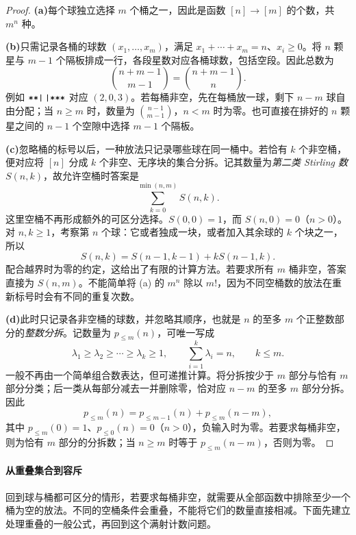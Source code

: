 \documentclass[lang=cn,a4paper,fontset=none,zihao=false,10pt,openany,twoside]{beautybook}
\numberwithin{algorithm}{chapter}
\begin{document}
\begin{proof}
\par\smallskip\noindent\textbf{(a)}\quad 每个球独立选择 $m$ 个桶之一，因此是函数 $[n]\to[m]$ 的个数，共 $m^n$ 种。

\par\smallskip\noindent\textbf{(b)}\quad 只需记录各桶的球数 $(x_1,\ldots,x_m)$，满足 $x_1+\cdots+x_m=n$、$x_i\ge0$。将 $n$ 颗星与 $m-1$ 个隔板排成一行，各段星数对应各桶球数，包括空段。因此总数为
\[
 \binom{n+m-1}{m-1}=\binom{n+m-1}n.
\]
例如 $\texttt{**|\,|***}$ 对应 $(2,0,3)$。若每桶非空，先在每桶放一球，剩下 $n-m$ 球自由分配；当 $n\ge m$ 时，数量为 $\binom{n-1}{m-1}$，$n<m$ 时为零。也可直接在排好的 $n$ 颗星之间的 $n-1$ 个空隙中选择 $m-1$ 个隔板。

\par\smallskip\noindent\textbf{(c)}\quad 忽略桶的标号以后，一种放法只记录哪些球在同一桶中。若恰有 $k$ 个非空桶，便对应将 $[n]$ 分成 $k$ 个非空、无序块的集合分拆。记其数量为\emph{第二类 Stirling 数} $S(n,k)$，故允许空桶时答案是
\[
 \sum_{k=0}^{\min(n,m)}S(n,k).
\]
这里空桶不再形成额外的可区分选择。$S(0,0)=1$，而 $S(n,0)=0$（$n>0$）。对 $n,k\ge1$，考察第 $n$ 个球：它或者独成一块，或者加入其余球的 $k$ 个块之一，所以
\[
 S(n,k)=S(n-1,k-1)+kS(n-1,k).
\]
配合越界时为零的约定，这给出了有限的计算方法。若要求所有 $m$ 桶非空，答案直接为 $S(n,m)$。不能简单将 (a) 的 $m^n$ 除以 $m!$，因为不同空桶数的放法在重新标号时会有不同的重复次数。

\par\smallskip\noindent\textbf{(d)}\quad 此时只记录各非空桶的球数，并忽略其顺序，也就是 $n$ 的至多 $m$ 个正整数部分的\emph{整数分拆}。记数量为 $p_{\le m}(n)$，可唯一写成
\[
 \lambda_1\ge\lambda_2\ge\cdots\ge\lambda_k\ge1,
 \qquad\sum_{i=1}^k\lambda_i=n,\qquad k\le m.
\]
一般不再由一个简单组合数表达，但可递推计算。将分拆按少于 $m$ 部分与恰有 $m$ 部分分类；后一类从每部分减去一并删除零，恰对应 $n-m$ 的至多 $m$ 部分分拆。因此
\[
 p_{\le m}(n)=p_{\le m-1}(n)+p_{\le m}(n-m),
\]
其中 $p_{\le m}(0)=1$、$p_{\le0}(n)=0$（$n>0$），负输入时为零。若要求每桶非空，则为恰有 $m$ 部分的分拆数；当 $n\ge m$ 时等于 $p_{\le m}(n-m)$，否则为零。
\end{proof}

\paragraph{从重叠集合到容斥}
回到球与桶都可区分的情形，若要求每桶非空，就需要从全部函数中排除至少一个桶为空的放法。不同的空桶条件会重叠，不能将它们的数量直接相减。下面先建立处理重叠的一般公式，再回到这个满射计数问题。
\end{document}

